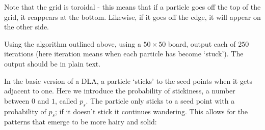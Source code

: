 \begin{center}
\end{center}

\noindent Note that the grid is toroidal - this means that if a particle goes off the top of the grid, it reappears at the bottom. Likewise, if it goes off the edge, it will appear on the other side.

\begin{exercise}
\label{ex:dla}
Using the algorithm outlined above, using a $50 \times 50$ board,
output each of $250$ iterations
(here iteration means when each particle has become `stuck').
The output should be in plain text.
\end{exercise}


In the basic version of a DLA, a particle `sticks' to the seed points when
it gets adjacent to one. Here we introduce the probability of stickiness,
a number between $0$ and $1$, called $p_s$. The particle only sticks
to a seed point with a probability of $p_s$; if
it doesn't stick it continues wandering. This allows for the patterns
that emerge to be more hairy and solid:

